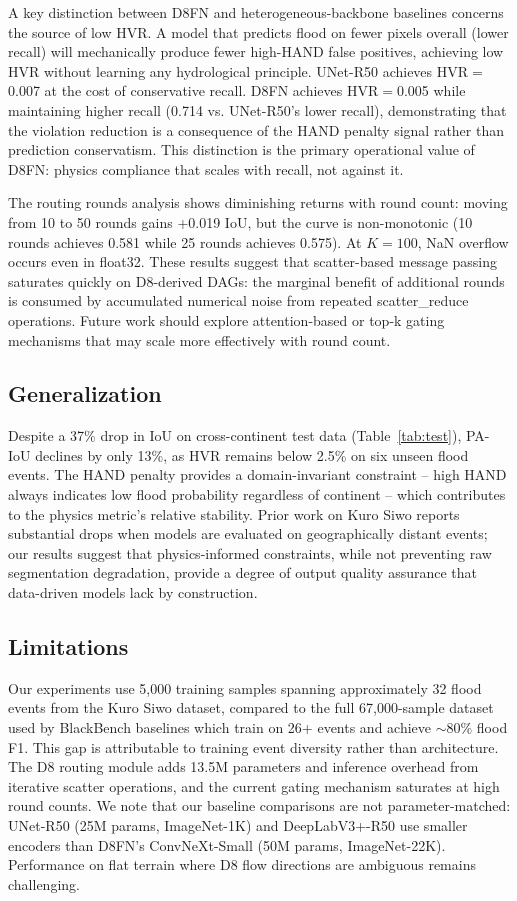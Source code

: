 \documentclass[journal]{IEEEtran}
\begin{document}
A key distinction between D8FN and heterogeneous-backbone baselines concerns the source of low HVR. A model that predicts flood on fewer pixels overall (lower recall) will mechanically produce fewer high-HAND false positives, achieving low HVR without learning any hydrological principle. UNet-R50 achieves HVR$=$0.007 at the cost of conservative recall. D8FN achieves HVR$=$0.005 while maintaining higher recall (0.714 vs. UNet-R50's lower recall), demonstrating that the violation reduction is a consequence of the HAND penalty signal rather than prediction conservatism. This distinction is the primary operational value of D8FN: physics compliance that scales with recall, not against it.

The routing rounds analysis shows diminishing returns with round count: moving from 10 to 50 rounds gains +0.019 IoU, but the curve is non-monotonic (10 rounds achieves 0.581 while 25 rounds achieves 0.575). At $K=100$, NaN overflow occurs even in float32. These results suggest that scatter-based message passing saturates quickly on D8-derived DAGs: the marginal benefit of additional rounds is consumed by accumulated numerical noise from repeated scatter\_reduce operations. Future work should explore attention-based or top-k gating mechanisms that may scale more effectively with round count.

\subsection{Generalization}
Despite a 37\% drop in IoU on cross-continent test data (Table~\ref{tab:test}), PA-IoU declines by only 13\%, as HVR remains below 2.5\% on six unseen flood events. The HAND penalty provides a domain-invariant constraint -- high HAND always indicates low flood probability regardless of continent -- which contributes to the physics metric's relative stability. Prior work on Kuro Siwo reports substantial drops when models are evaluated on geographically distant events; our results suggest that physics-informed constraints, while not preventing raw segmentation degradation, provide a degree of output quality assurance that data-driven models lack by construction.

\subsection{Limitations}
Our experiments use 5,000 training samples spanning approximately 32 flood events from the Kuro Siwo dataset, compared to the full 67,000-sample dataset used by BlackBench baselines which train on 26+ events and achieve $\sim$80\% flood F1. This gap is attributable to training event diversity rather than architecture. The D8 routing module adds 13.5M parameters and inference overhead from iterative scatter operations, and the current gating mechanism saturates at high round counts. We note that our baseline comparisons are not parameter-matched: UNet-R50 (25M params, ImageNet-1K) and DeepLabV3+-R50 use smaller encoders than D8FN's ConvNeXt-Small (50M params, ImageNet-22K). Performance on flat terrain where D8 flow directions are ambiguous remains challenging.
\end{document}
